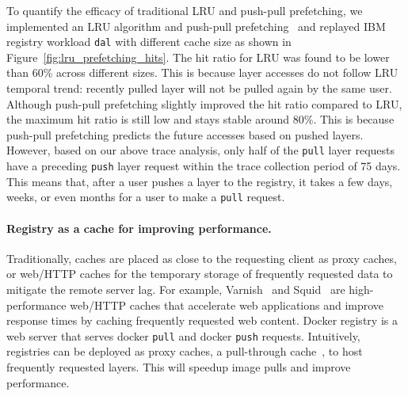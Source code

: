To quantify the efficacy of traditional LRU and push-pull prefetching,
we implemented an LRU algorithm and push-pull prefetching~\cite{dockerworkload} 
and replayed 
IBM registry workload \texttt{dal} with different cache size as shown in 
Figure~\ref{fig:lru_prefetching_hits}.
The hit ratio for LRU was found to be lower than $60$\% across different sizes.
This is because layer accesses do not follow LRU temporal trend:
recently pulled layer will not be pulled again by the same user.
Although push-pull prefetching slightly improved the hit ratio compared to LRU,
the maximum hit ratio is still low and stays stable around $80$\%.
This is because push-pull prefetching predicts the future accesses based on  
pushed layers.
However, based on our above trace analysis,
only half of the \texttt{pull} layer
requests have a preceding \texttt{push} layer request within the trace
collection period of 75 days. This means that, after a user pushes a layer
to the registry, it takes a few days, weeks, or even months for a user to make
a \texttt{pull} request. 




\paragraph{Registry as a cache for improving performance.}
Traditionally, caches are placed as close to the requesting client as 
proxy caches, or web/HTTP caches for the temporary storage of 
frequently requested data to mitigate the remote server lag. 
For example, Varnish~\cite{varnish} and Squid~\cite{squid} are high-performance web/HTTP caches that accelerate web applications and improve response times by caching frequently requested web content.
Docker registry is a web server that serves docker \texttt{pull} and docker \texttt{push} requests.
Intuitively, registries can be deployed as proxy caches, \ie a pull-through cache~\cite{registryascache}, to host frequently requested layers. This will speedup image pulls and improve performance. 

